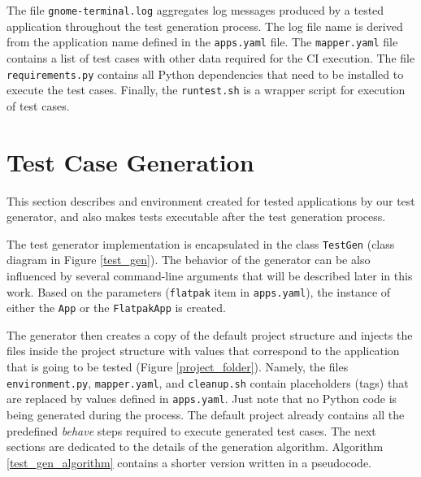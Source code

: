 The file \texttt{gnome-terminal.log} aggregates log messages produced by a tested application throughout the test generation process. The log file name is derived from the application name defined in the \texttt{apps.yaml} file. The \texttt{mapper.yaml} file contains a list of test cases with other data required for the CI execution. The file \texttt{requirements.py} contains all Python dependencies that need to be installed to execute the test cases. Finally, the \texttt{runtest.sh} is a wrapper script for execution of test cases.

\section{Test Case Generation}\label{generation}

This section describes and environment created for tested applications by our test generator, and also makes tests executable after the test generation process.

The test generator implementation is encapsulated in the class \texttt{TestGen} (class diagram in Figure \ref{test_gen}). The behavior of the generator can be also influenced by several command-line arguments that will be described later in this work. Based on the parameters (\texttt{flatpak} item in \texttt{apps.yaml}), the instance of either the \texttt{App} or the \texttt{FlatpakApp} is created. 

The generator then creates a copy of the default project structure and injects the files inside the project structure with values that correspond to the application that is going to be tested (Figure \ref{project_folder}). Namely, the files \texttt{environment.py}, \texttt{mapper.yaml}, and \texttt{cleanup.sh} contain placeholders (tags) that are replaced by values defined in \texttt{apps.yaml}. Just note that no Python code is being generated during the process. The default project already contains all the predefined \textit{behave} steps required to execute generated test cases.
The next sections are dedicated to the details of the generation algorithm. Algorithm \ref{test_gen_algorithm} contains a shorter version written in a pseudocode. 

